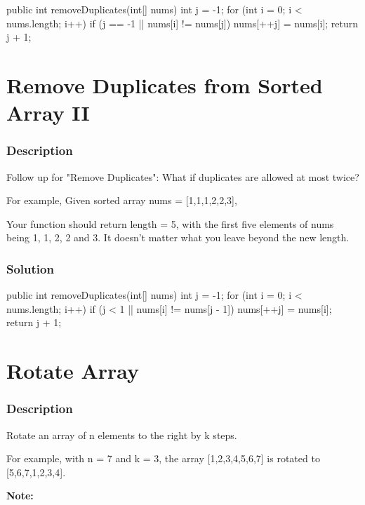 \begin{Code}
public int removeDuplicates(int[] nums) {
    int j = -1;
    for (int i = 0; i < nums.length; i++) {
        if (j == -1 || nums[i] != nums[j]) {
            nums[++j] = nums[i];
        }
    }
    return j + 1;
}
\end{Code}

\newpage

\section{Remove Duplicates from Sorted Array II} %

\subsubsection{Description}
Follow up for "Remove Duplicates":
What if duplicates are allowed at most twice?

For example,
Given sorted array nums = [1,1,1,2,2,3],

Your function should return length = 5, with the first five elements of nums being 1, 1, 2, 2 and 3. It doesn't matter what you leave beyond the new length.

\subsubsection{Solution}

\begin{Code}
public int removeDuplicates(int[] nums) {
    int j = -1;
    for (int i = 0; i < nums.length; i++) {
        if (j < 1 || nums[i] != nums[j - 1]) {
            nums[++j] = nums[i];
        }
    }
    return j + 1;
}
\end{Code}

\newpage

\section{Rotate Array} %

\subsubsection{Description}
Rotate an array of n elements to the right by k steps.

For example, with n = 7 and k = 3, the array [1,2,3,4,5,6,7] is rotated to [5,6,7,1,2,3,4].

\textbf{Note:}

